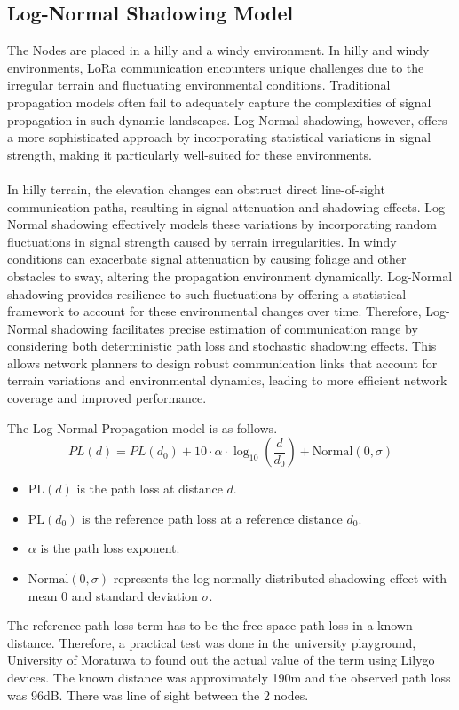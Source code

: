 \subsection{Log-Normal Shadowing Model}
\label{sec:Log-Normal}
The Nodes are placed in a hilly and a windy environment. In hilly and windy environments, LoRa communication encounters unique challenges due to the irregular terrain and fluctuating environmental conditions. Traditional propagation models often fail to adequately capture the complexities of signal propagation in such dynamic landscapes. Log-Normal shadowing, however, offers a more sophisticated approach by incorporating statistical variations in signal strength, making it particularly well-suited for these environments.\\\\
In hilly terrain, the elevation changes can obstruct direct line-of-sight communication paths, resulting in signal attenuation and shadowing effects. Log-Normal shadowing effectively models these variations by incorporating random fluctuations in signal strength caused by terrain irregularities. In windy conditions can exacerbate signal attenuation by causing foliage and other obstacles to sway, altering the propagation environment dynamically. Log-Normal shadowing provides resilience to such fluctuations by offering a statistical framework to account for these environmental changes over time. Therefore,  Log-Normal shadowing facilitates precise estimation of communication range by considering both deterministic path loss and stochastic shadowing effects. This allows network planners to design robust communication links that account for terrain variations and environmental dynamics, leading to more efficient network coverage and improved performance.

The Log-Normal Propagation model is as follows.\\
\begin{equation}
PL(d) = PL(d_0) + 10 \cdot \alpha \cdot \log_{10}\left(\frac{d}{d_0}\right) + \text{Normal}(0, \sigma)
\end{equation}
\begin{itemize}
    \item $\text{PL}(d)$ is the path loss at distance $d$.
    \item $\text{PL}(d_0)$ is the reference path loss at a reference distance $d_0$.
    \item $\alpha$ is the path loss exponent.
    \item $\text{Normal}(0, \sigma)$ represents the log-normally distributed shadowing effect with mean 0 and standard deviation $\sigma$.\\
\end{itemize}
The reference path loss term has to be the free space path loss in a known distance. Therefore, a practical test was done in the university playground, University of Moratuwa to found out the actual value of the term using Lilygo devices. The known distance was approximately 190m and the observed path loss was 96dB. There was line of sight between the 2 nodes.

